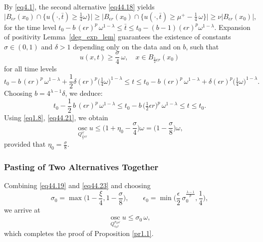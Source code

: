 \documentclass[a4paper,11pt,fullpage]{article}
\DeclareMathOperator*{\osc}{osc}
\numberwithin{equation}{section}
\begin{document}
By \eqref{eq4.1}, the second alternative \eqref{eq44.18} yields
\begin{equation}\label{eq44.20}
\big|B_{\epsilon r}(x_0)\cap\big\{u(\cdot, \bar{t})\geqslant \tfrac{1}{4}\omega\big\}\big|\geqslant
\big|B_{\epsilon r}(x_0)\cap\{u(\cdot, \bar{t})\geqslant \mu^+-\tfrac{1}{4}\,\omega\}\big|\geqslant \nu |B_{\epsilon r}(x_0)|,
\end{equation}
for the time level
$t_0-b\,(\epsilon r)^{p}\,\omega^{1-\lambda}\leqslant \bar{t}\leqslant t_0-(b-1)(\epsilon r)^{p}\omega^{1-\lambda}$. 
Expansion of positivity Lemma~\ref{deg_exp_lem} guarantees the existence of constants $\sigma\in(0,1)$ and $\delta >1$ depending only on the data and on $b$, such that
\begin{equation}\label{eq44.21}
u(x, t)\geqslant \frac{\sigma}{4}\,\omega,\quad x\in B_{\frac{1}{2}\epsilon r}(x_0)
\end{equation}
for all time levels
$$
t_0-b\,(\epsilon r)^{p}\,\omega^{1-\lambda}+\frac{1}{2}\delta(\epsilon r)^p \big(\tfrac{1}{4}\omega\big)^{1-\lambda}\leqslant t\leqslant t_0-b\,(\epsilon r)^{p}\,\omega^{1-\lambda}+\delta(\epsilon r)^p \big(\tfrac{1}{4}\omega\big)^{1-\lambda}.
$$
Choosing $b=4^{\lambda-1}\delta$, we deduce:
\begin{equation*}
t_0-\frac{1}{2}\,b\,(\epsilon r)^{p}\,\omega^{1-\lambda}\leqslant t_0-b\,\big(\tfrac{1}{2}\epsilon r\big)^{p}\,\omega^{1-\lambda}\leqslant t\leqslant t_0.
\end{equation*}
Using \eqref{eq1.8},  \eqref{eq44.21}, we obtain
\begin{equation}\label{eq44.23}
\osc\limits_{Q^{\omega}_{\frac{1}{2}\epsilon r}} u\leqslant \biggr(1+\eta_0-\frac{\sigma}{4}\biggr)\omega=\biggr(1-\frac{\sigma}{8}\biggr)\omega,
\end{equation}
provided that $\eta_0=\frac{\sigma}{8}$. 

\subsubsection{Pasting of Two Alternatives Together}

Combining \eqref{eq44.19} and \eqref{eq44.23} and choosing 
$$
\sigma_0=\max\biggr(1-\frac{\xi}{4},1-\frac{\sigma}{8}\biggr), \qquad\epsilon_0=\min\biggr(\frac{\epsilon}{2}\,\sigma_0^\frac{\lambda-1}{p},\frac{1}{4}\biggr),
$$
we arrive at
\begin{equation}\label{eq44.15}
\osc\limits_{Q^{\sigma_0\omega}_{\epsilon_0 r}} u \leqslant  \sigma_0\,\omega,
\end{equation}
which completes the proof of Proposition \ref{pr1.1}.
\end{document}
